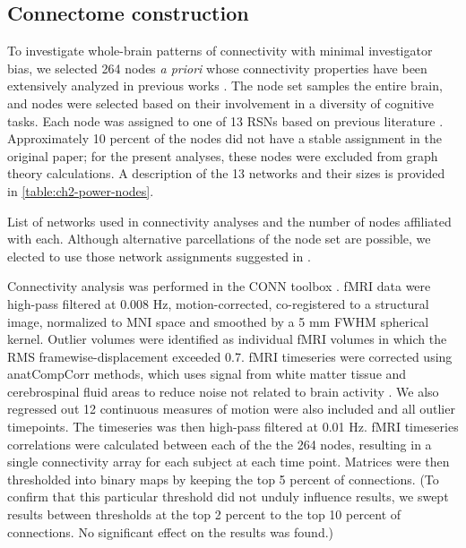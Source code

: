 \subsection{Connectome construction}

To investigate whole-brain patterns of connectivity with minimal investigator bias, we selected 264 nodes \textit{a priori} whose connectivity properties have been extensively analyzed in previous works \citep{Power2011}. The node set samples the entire brain, and nodes were selected based on their involvement in a diversity of cognitive tasks. Each node was assigned to one of 13 RSNs based on previous literature \citep{Power2013}. Approximately 10 percent of the nodes did not have a stable assignment in the original paper; for the present analyses, these nodes were excluded from graph theory calculations. A description of the 13 networks and their sizes is provided in \ref{table:ch2-power-nodes}. 

\begin{table}
	\renewcommand{\tabcolsep}{0.09cm}
	\centering
	
	\caption[List of networks.]{List of networks used in connectivity analyses and the number of nodes affiliated with each. Although alternative parcellations of the node set are possible, we elected to use those network assignments suggested in \citep{Power2013}.}
	\label{table:ch2-power-nodes}
\end{table}

Connectivity analysis was performed in the CONN toolbox \citep{WhitfieldGabrieli2012}. fMRI data were high-pass filtered at 0.008 Hz, motion-corrected, co-registered to a structural image, normalized to MNI space and smoothed by a 5 mm FWHM spherical kernel. Outlier volumes were identified as individual fMRI volumes in which the RMS framewise-displacement exceeded 0.7. fMRI timeseries were corrected using anatCompCorr methods, which uses signal from white matter tissue and cerebrospinal fluid areas to reduce noise not related to brain activity \citep{Chai2012}. We also regressed out 12 continuous measures of motion were also included and all outlier timepoints. The timeseries was then high-pass filtered at 0.01 Hz. fMRI timeseries correlations were calculated between each of the the 264 nodes, resulting in a single connectivity array for each subject at each time point. Matrices were then thresholded into binary maps by keeping the top 5 percent of connections. (To confirm that this particular threshold did not unduly influence results, we swept results between thresholds at the top 2 percent to the top 10 percent of connections. No significant effect on the results was found.)

